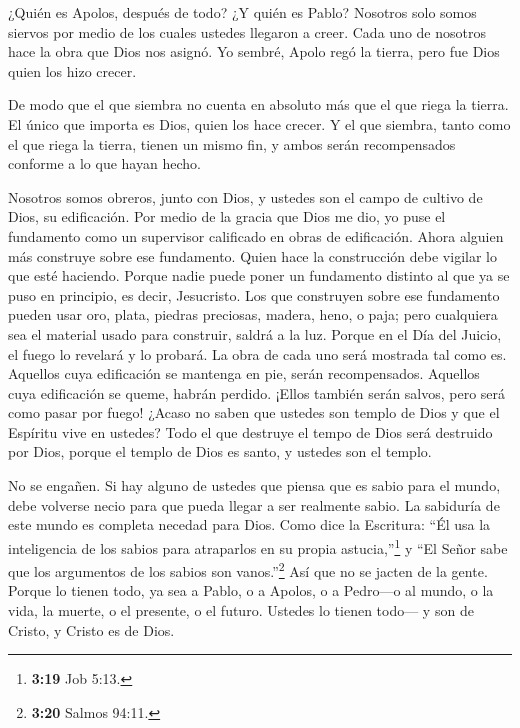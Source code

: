  ¿Quién es Apolos, después de todo? ¿Y quién es Pablo?
Nosotros solo somos siervos por medio de los cuales ustedes llegaron a
creer. Cada uno de nosotros hace la obra que Dios nos asignó.
 Yo sembré, Apolo regó la tierra, pero fue Dios quien los
hizo crecer.

 De modo que el que siembra no cuenta en absoluto más que el
que riega la tierra. El único que importa es Dios, quien los hace
crecer.  Y el que siembra, tanto como el que riega la
tierra, tienen un mismo fin, y ambos serán recompensados conforme a lo
que hayan hecho.

 Nosotros somos obreros, junto con Dios, y ustedes son el
campo de cultivo de Dios, su edificación.  Por medio de la
gracia que Dios me dio, yo puse el fundamento como un supervisor
calificado en obras de edificación. Ahora alguien más construye sobre
ese fundamento. Quien hace la construcción debe vigilar lo que esté
haciendo.  Porque nadie puede poner un fundamento distinto
al que ya se puso en principio, es decir, Jesucristo.  Los
que construyen sobre ese fundamento pueden usar oro, plata, piedras
preciosas, madera, heno, o paja;  pero cualquiera sea el
material usado para construir, saldrá a la luz. Porque en el Día del
Juicio, el fuego lo revelará y lo probará. La obra de cada uno será
mostrada tal como es.  Aquellos cuya edificación se
mantenga en pie, serán recompensados.  Aquellos cuya
edificación se queme, habrán perdido. ¡Ellos también serán salvos, pero
será como pasar por fuego!  ¿Acaso no saben que ustedes son
templo de Dios y que el Espíritu vive en ustedes?  Todo el
que destruye el tempo de Dios será destruido por Dios, porque el templo
de Dios es santo, y ustedes son el templo.

 No se engañen. Si hay alguno de ustedes que piensa que es
sabio para el mundo, debe volverse necio para que pueda llegar a ser
realmente sabio.  La sabiduría de este mundo es completa
necedad para Dios. Como dice la Escritura: ``Él usa la inteligencia de
los sabios para atraparlos en su propia astucia,''\footnote{\textbf{3:19}
  Job 5:13.}  y ``El Señor sabe que los argumentos de los
sabios son vanos.''\footnote{\textbf{3:20} Salmos 94:11.} 
Así que no se jacten de la gente. Porque lo tienen todo, 
ya sea a Pablo, o a Apolos, o a Pedro---o al mundo, o la vida, la
muerte, o el presente, o el futuro. Ustedes lo tienen todo---
 y son de Cristo, y Cristo es de Dios.


